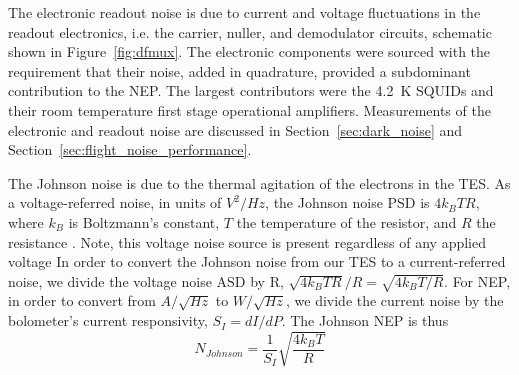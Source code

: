 The electronic readout noise is due to current and voltage fluctuations in the readout electronics, i.e. the carrier, nuller, and demodulator circuits, schematic shown in Figure~\ref{fig:dfmux}. 
The electronic components were sourced with the requirement that their noise, added in quadrature, provided a subdominant contribution to the \ac{NEP}. 
The largest contributors were the 4.2~K \ac{SQUID}s and their room temperature first stage operational amplifiers. 
Measurements of the electronic and readout noise are discussed in Section~\ref{sec:dark_noise} and Section~\ref{sec:flight_noise_performance}.

The Johnson noise is due to the thermal agitation of the electrons in the \ac{TES}. 
As a voltage-referred noise, in units of $V^2/Hz$, the Johnson noise \ac{PSD} is $4k_{B}TR$,
where $k_{B}$ is Boltzmann's constant, $T$ the temperature of the resistor, and $R$ the resistance \cite{PhysRev.32.97}.
Note, this voltage noise source is present regardless of any applied voltage
In order to convert the Johnson noise from our \ac{TES} to a current-referred noise, we divide the voltage noise \ac{ASD} by R, $\sqrt{4k_{B}TR}/R = \sqrt{4k_BT/R}$. 
For \ac{NEP}, in order to convert from $A/\sqrt{Hz}$ to $W/\sqrt{Hz}$, we divide the current noise by the bolometer's current responsivity, $S_{I} = dI/dP$. 
The Johnson \ac{NEP} is thus
\begin{equation}
N_{Johnson} =  \frac{1}{S_I} \sqrt{ \frac{4k_{B}T}{R}}
\label{eq:johnson}
\end{equation}

